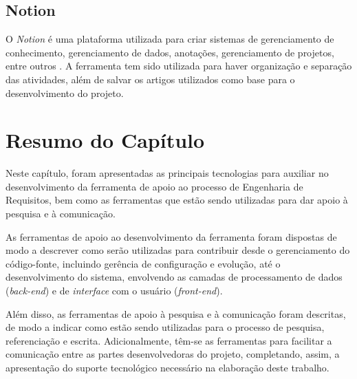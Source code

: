 \subsection{Notion}
O \textit{Notion} é uma plataforma utilizada para criar sistemas de gerenciamento de conhecimento, gerenciamento de dados, anotações, gerenciamento de projetos, entre outros \cite{notion}. A ferramenta tem sido utilizada para haver organização e separação das atividades, além de salvar os artigos utilizados como base para o desenvolvimento do projeto.

\section{Resumo do Capítulo}

\label{sec_tec_resumo}

Neste capítulo, foram apresentadas as principais tecnologias para auxiliar no desenvolvimento da ferramenta de apoio ao processo de Engenharia de Requisitos, bem como as ferramentas que estão sendo utilizadas para dar apoio à pesquisa e à comunicação.

As ferramentas de apoio ao desenvolvimento da ferramenta foram dispostas de modo a descrever como serão utilizadas para contribuir desde o gerenciamento do código-fonte, incluindo gerência de configuração e evolução, até o desenvolvimento do sistema, envolvendo as camadas de processamento de dados (\textit{back-end}) e de \textit{interface} com o usuário (\textit{front-end}).

Além disso, as ferramentas de apoio à pesquisa e à comunicação foram descritas, de modo a indicar como estão sendo utilizadas para o processo de pesquisa, referenciação e escrita. Adicionalmente, têm-se as ferramentas para facilitar a comunicação entre as partes desenvolvedoras do projeto, completando, assim, a apresentação do suporte tecnológico necessário na elaboração deste trabalho.